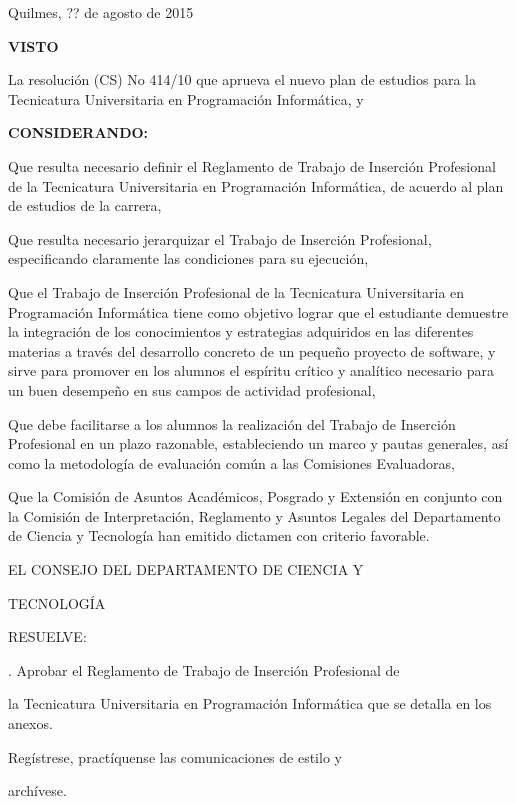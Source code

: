 Quilmes, ?? de agosto de 2015

\textbf{VISTO}

La resolución (CS) No 414/10 que aprueva el nuevo plan de estudios para la Tecnicatura Universitaria 
en Programación Informática, y
\newline

\textbf{CONSIDERANDO:}

Que resulta necesario definir el Reglamento de Trabajo de Inserción
Profesional de la Tecnicatura Universitaria en Programación Informática, de acuerdo al
plan de estudios de la carrera,

Que resulta necesario jerarquizar el Trabajo de Inserción Profesional,
especificando claramente las condiciones para su ejecución,

Que el Trabajo de Inserción Profesional de la Tecnicatura Universitaria en
Programación Informática tiene como objetivo lograr que el estudiante demuestre la
integración de los conocimientos y estrategias adquiridos en las diferentes materias a
través del desarrollo concreto de un pequeño proyecto de software, y sirve para
promover en los alumnos el espíritu crítico y analítico necesario para un buen
desempeño en sus campos de actividad profesional,

Que debe facilitarse a los alumnos la realización del Trabajo de Inserción
Profesional en un plazo razonable, estableciendo un marco y pautas generales, así
como la metodología de evaluación común a las Comisiones Evaluadoras,

Que la Comisión de Asuntos Académicos, Posgrado y Extensión en conjunto
con la Comisión de Interpretación, Reglamento y Asuntos Legales del Departamento
de Ciencia y Tecnología han emitido dictamen con criterio favorable.

EL CONSEJO DEL DEPARTAMENTO DE CIENCIA Y

TECNOLOGÍA

RESUELVE:

\articulo. Aprobar el Reglamento de Trabajo de Inserción Profesional de

la Tecnicatura Universitaria en Programación Informática que se detalla en los anexos.

\articulo Regístrese, practíquense las comunicaciones de estilo y

archívese.
